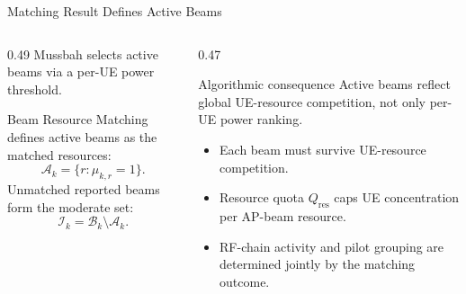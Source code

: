 \documentclass[10pt,aspectratio=169]{beamer}
\newcommand{\BRM}{Beam Resource Matching}
\newenvironment{tightitemize}{%
    \begin{itemize}
        \setlength{\itemsep}{2pt}
        \setlength{\parskip}{0pt}
        \setlength{\parsep}{0pt}
}{%
    \end{itemize}
}
\begin{document}
\begin{frame}{Matching Result Defines Active Beams}
    \small
    \begin{columns}[T,onlytextwidth]
        \begin{column}{0.49\textwidth}
            Mussbah selects active beams via a per-UE power threshold.
            
            \vspace{0.5em}
            \BRM{} defines active beams as the matched resources:
            \[
                \mathcal{A}_k=\{r:\mu_{k,r}=1\}.
            \]
            Unmatched reported beams form the moderate set:
            \[
                \mathcal{I}_k=\mathcal{B}_k\setminus\mathcal{A}_k.
            \]
        \end{column}
        \begin{column}{0.47\textwidth}
            \begin{block}{Algorithmic consequence}
                Active beams reflect global UE-resource competition, not only per-UE power ranking.
            \end{block}
            
            \begin{tightitemize}
                \item Each beam must survive UE-resource competition.
                \item Resource quota \(Q_{\mathrm{res}}\) caps UE concentration per AP-beam resource.
                \item RF-chain activity and pilot grouping are determined jointly by the matching outcome.
            \end{tightitemize}
        \end{column}
    \end{columns}
\end{frame}
\end{document}
